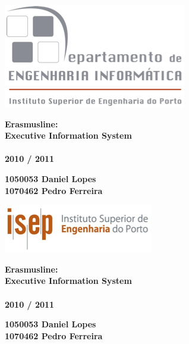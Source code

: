 \begin{titlepage}      
	\begin{center}
		\includegraphics{img/logoisep2.png}\\
	\end{center}
	
	\vfill
	\begin{center}
		\bf \LARGE Erasmusline: \\Executive Information System\\
		\ \\ \normalsize 2010 / 2011
	\end{center}
	
	\vfill
	\begin{center}
		\bf 1050053 Daniel Lopes\\
		1070462 Pedro Ferreira\\
	\end{center}
	
	\vfill
	\begin{center}
		\includegraphics{img/logoisep.png}\\
	\end{center}
	

\end{titlepage}
\newpage

	\vfill
	\begin{center}
		\bf \LARGE Erasmusline: \\Executive Information System\\
		\ \\ \normalsize 2010 / 2011
	\end{center}

	\vfill
	\begin{center}
		\bf 1050053 Daniel Lopes\\
		1070462 Pedro Ferreira\\
	\end{center}
	
